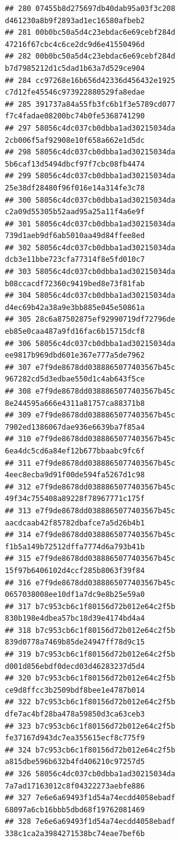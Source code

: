 \documentclass[]{article}
\begin{document}
\begin{verbatim}
## 280 07455b8d275697db40dab95a03f3c208   d461230a8b9f2893ad1ec16580afbeb2
## 281 00b0bc50a5d4c23ebdac6e69cebf284d   47216f67cbc4c6ce2dc9d6e41550496d
## 282 00b0bc50a5d4c23ebdac6e69cebf284d   b7d7985212d1c5dad1b63a7d529ce904
## 284 cc97268e16b656d42336d456432e1925   c7d12fe45546c973922880529fa8edae
## 285 391737a84a55fb3fc6b1f3e5789cd077   f7c4fadae08200bc74b0fe5368741290
## 297 58056c4dc037cb0dbba1ad30215034da   2cb006f5af92908e10f658a662e1d5dc
## 298 58056c4dc037cb0dbba1ad30215034da   5b6caf13d5494dbcf97f7cbc08fb4474
## 299 58056c4dc037cb0dbba1ad30215034da   25e38df28480f96f016e14a314fe3c78
## 300 58056c4dc037cb0dbba1ad30215034da   c2a09d55305b52aad95a25a11f4a6e9f
## 301 58056c4dc037cb0dbba1ad30215034da   739d1aeb9df6ab5010aa49d84ffee8ed
## 302 58056c4dc037cb0dbba1ad30215034da   dcb3e11bbe723cfa77314f8e5fd010c7
## 303 58056c4dc037cb0dbba1ad30215034da   b08ccacdf72360c9419bed8e73f81fab
## 304 58056c4dc037cb0dbba1ad30215034da   d4ec69b42a38a9e3bb885e045e50861a
## 305 28c6a87502875ef92990719df72796de   eb85e0caa487a9fd16fac6b15715dcf8
## 306 58056c4dc037cb0dbba1ad30215034da   ee9817b969dbd601e367e777a5de7962
## 307 e7f9de8678dd0388865077403567b45c   967282cd5d3edbae550d1c4ab643f5ce
## 308 e7f9de8678dd0388865077403567b45c   8e244595a666e4311a81757ca88371b8
## 309 e7f9de8678dd0388865077403567b45c   7902ed1386067dae936e6639ba7f85a4
## 310 e7f9de8678dd0388865077403567b45c   6ea4dc5cd6a84ef12b677bbaabc9fc6f
## 311 e7f9de8678dd0388865077403567b45c   4eec8ecba9d91f00de594fa5267d1c98
## 312 e7f9de8678dd0388865077403567b45c   49f34c755408a89228f78967771c175f
## 313 e7f9de8678dd0388865077403567b45c   aacdcaab42f85782dbafce7a5d26b4b1
## 314 e7f9de8678dd0388865077403567b45c   f1b5a149b72512dffa7774d6a793b41b
## 315 e7f9de8678dd0388865077403567b45c   15f97b6406102d4ccf285b8063f39f84
## 316 e7f9de8678dd0388865077403567b45c   0657038008ee10df1a7dc9e8b25e59a0
## 317 b7c953cb6c1f80156d72b012e64c2f5b   830b198e4dbea57bc18d39e4174bd4a4
## 318 b7c953cb6c1f80156d72b012e64c2f5b   839d0778a7469b85de24947ff78d9c15
## 319 b7c953cb6c1f80156d72b012e64c2f5b   d001d856ebdf0decd03d46283237d5d4
## 320 b7c953cb6c1f80156d72b012e64c2f5b   ce9d8ffcc3b2509bdf8bee1e4787b014
## 322 b7c953cb6c1f80156d72b012e64c2f5b   dfe7ac4bf28ba478a59850d3ca63ceb3
## 323 b7c953cb6c1f80156d72b012e64c2f5b   fe37167d943dc7ea355615ecf8c775f9
## 324 b7c953cb6c1f80156d72b012e64c2f5b   a815dbe596b632b4fd406210c97257d5
## 326 58056c4dc037cb0dbba1ad30215034da   7a7ad17163012c8f04322273aebfe886
## 327 7e6e6a69493f1d54a74ecdd4058ebadf   68097a6cb16bbb5dbd68f19762081469
## 328 7e6e6a69493f1d54a74ecdd4058ebadf   338c1ca2a3984271538bc74eae7bef6b

\end{verbatim}
\end{document}
